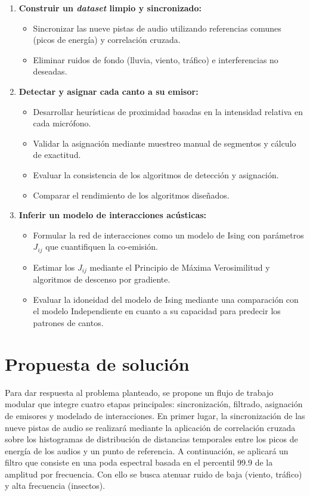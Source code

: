 \begin{enumerate}
  \item \textbf{Construir un \emph{dataset} limpio y sincronizado:}  
    \begin{itemize}
      \item Sincronizar las nueve pistas de audio utilizando referencias comunes (picos de energía) y correlación cruzada.  \cite{costa2021comparing}
      \item Eliminar ruidos de fondo (lluvia, viento, tráfico) e interferencias no deseadas.
    \end{itemize}
  \item \textbf{Detectar y asignar cada canto a su emisor:}  
    \begin{itemize}
      \item Desarrollar heurísticas de proximidad basadas en la intensidad relativa en cada micrófono.  
      \item Validar la asignación mediante muestreo manual de segmentos y cálculo de exactitud.
      \item Evaluar la consistencia de los algoritmos de detección y asignación.
      \item Comparar el rendimiento de los algoritmos diseñados.
    \end{itemize}
  \item \textbf{Inferir un modelo de interacciones acústicas:}  
    \begin{itemize}
      \item Formular la red de interacciones como un modelo de Ising con parámetros \(J_{ij}\) que cuantifiquen la co-emisión.  
      \item Estimar los \(J_{ij}\) mediante el Principio de Máxima Verosimilitud \cite{fisher1912maximum} y algoritmos de descenso por gradiente.
      \item Evaluar la idoneidad del modelo de Ising mediante una comparación con el modelo Independiente en cuanto a su capacidad para predecir los patrones de cantos.
    \end{itemize}
\end{enumerate}


\section{Propuesta de solución}
\label{sec:propuesta_solucion}

Para dar respuesta al problema planteado, se propone un 
flujo de trabajo modular que integre cuatro etapas principales: 
sincronización, filtrado, asignación de 
emisores y modelado de interacciones. En primer lugar, la 
sincronización de las nueve pistas de audio se realizará 
mediante la aplicación de correlación cruzada sobre los histogramas
de distribución de distancias temporales entre los picos de energía de los audios 
y un punto de referencia. A continuación, se 
aplicará un filtro que consiste en una poda espectral
basada en el percentil 99.9 de la amplitud por frecuencia.
Con ello se busca atenuar 
ruido de baja (viento, tráfico) y alta frecuencia (insectos).  

